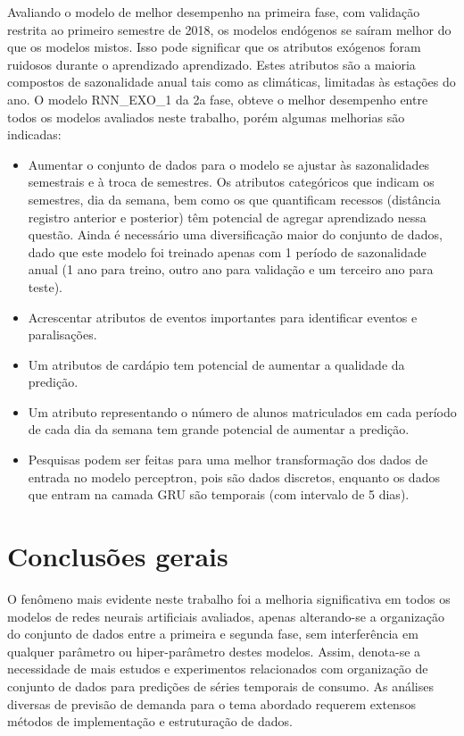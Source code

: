     Avaliando o modelo de melhor desempenho na primeira fase, com validação restrita ao primeiro semestre de 2018, os modelos endógenos se saíram melhor do que os modelos mistos. Isso pode significar que os atributos exógenos foram ruidosos durante o aprendizado aprendizado. Estes atributos são a maioria compostos de sazonalidade anual tais como as climáticas, limitadas às estações do ano. 
    O modelo RNN\_EXO\_1 da 2a fase, obteve o melhor desempenho entre todos os modelos avaliados neste trabalho, porém algumas melhorias são indicadas:
        \begin{itemize}
            \item Aumentar o conjunto de dados para o modelo se ajustar às sazonalidades semestrais e à troca de semestres. Os atributos categóricos que indicam os semestres, dia da semana, bem como os que quantificam recessos (distância registro anterior e posterior) têm potencial de agregar aprendizado nessa questão. Ainda é  necessário uma diversificação maior do conjunto de dados, dado que este modelo foi treinado apenas com 1 período de sazonalidade anual (1 ano para treino, outro ano para validação e um terceiro ano para teste).
            \item Acrescentar atributos de eventos importantes para identificar eventos e paralisações.
            \item Um atributos de cardápio tem potencial de aumentar a qualidade da predição.
            \item Um atributo representando o número de alunos matriculados em cada período de cada dia da semana tem grande potencial de aumentar a predição.
            \item Pesquisas podem ser feitas para uma melhor transformação dos dados de entrada no modelo perceptron, pois são dados discretos, enquanto os dados que entram na camada GRU são temporais (com intervalo de 5 dias).
        \end{itemize}
        
    \section{Conclusões gerais}
        
        O fenômeno mais evidente neste trabalho foi a melhoria significativa em todos os modelos de redes neurais artificiais avaliados, apenas alterando-se a organização do conjunto de dados entre a primeira e segunda fase, sem interferência em qualquer parâmetro ou hiper-parâmetro destes modelos. Assim, denota-se a necessidade de mais estudos e experimentos relacionados com organização de conjunto de dados para predições de séries temporais de consumo. As análises diversas de previsão de demanda para o tema abordado requerem extensos métodos de implementação e estruturação de dados.
        
